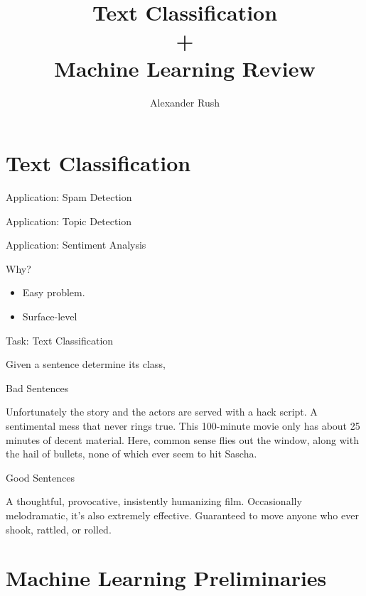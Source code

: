 \documentclass{beamer}
\title{Text Classification\\ + \\ Machine Learning Review }
\author{Alexander Rush}
\begin{document}
\begin{frame}
  \titlepage
\end{frame}

\section{Text Classification }

\begin{frame}{Application: Spam Detection}

\end{frame}

\begin{frame}{Application: Topic Detection}

\end{frame}

\begin{frame}{Application: Sentiment Analysis}
  
\end{frame}

\begin{frame}{Why?}
  \begin{itemize}
  \item Easy problem.
  \end{itemize}
  \begin{itemize}
  \item Surface-level
  \end{itemize}
\end{frame}

\begin{frame}{Task: Text Classification}

  Given a sentence determine its class, 

  Bad Sentences

  Unfortunately the story and the actors are served with a hack script. 
  A sentimental mess that never rings true.
  This 100-minute movie only has about 25 minutes of decent material.  
  Here, common sense flies out the window, along with the hail of bullets, none of which ever seem to hit Sascha. 

  Good Sentences
  
  A thoughtful, provocative, insistently humanizing film. 
  Occasionally melodramatic, it's also extremely effective.
  Guaranteed to move anyone who ever shook, rattled, or rolled.   
\end{frame}


\section{Machine Learning Preliminaries}
\end{document}
